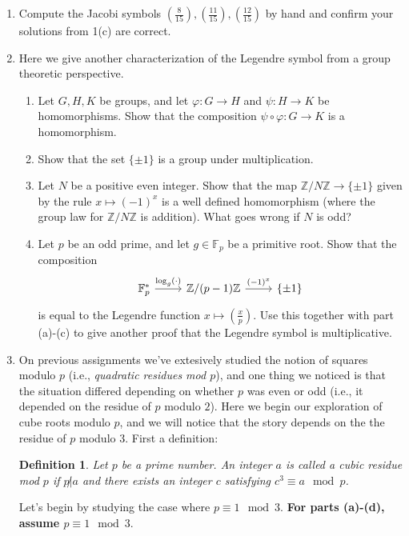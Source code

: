 \documentclass[11pt]{article}
\newtheorem{definition}{Definition}
\newcommand{\bF}{\mathbb{F}}
\newcommand{\bZ}{\mathbb{Z}}
\begin{document}
\begin{enumerate}
{\begin{enumerate}
  \end{enumerate}
  }
  \item{
  Compute the Jacobi symbols $\left(\frac{8}{15}\right),\left(\frac{11}{15}\right),\left(\frac{12}{15}\right)$ by hand and confirm your solutions from 1(c) are correct.
  }
  \item{
  Here we give another characterization of the Legendre symbol from a group theoretic perspective.
  \begin{enumerate}
    \item{
    Let $G,H,K$ be groups, and let $\varphi:G\to H$ and $\psi:H\to K$ be homomorphisms.  Show that the composition $\psi\circ\varphi:G\to K$ is a homomorphism.
    }
    \item{
    Show that the set $\{\pm1\}$ is a group under multiplication.
    }
    \item{
    Let $N$ be a positive even integer.  Show that the map $\bZ/N\bZ\to\{\pm1\}$ given by the rule $x\mapsto (-1)^x$ is a well defined homomorphism (where the group law for $\bZ/N\bZ$ is addition).  What goes wrong if $N$ is odd?
    }
    \item{
    Let $p$ be an odd prime, and let $g\in\bF_p$ be a primitive root.  Show that the composition
    \[
    \begin{tikzcd}
      \bF_p^*\ar[r,"\log_g(\cdot)"]&\bZ/(p-1)\bZ\ar[r,"(-1)^x"]&\{\pm1\}
    \end{tikzcd}
    \]
    is equal to the Legendre function $x\mapsto\left(\frac{x}{p}\right)$.  Use this together with part (a)-(c) to give another proof that the Legendre symbol is multiplicative.
    }
  \end{enumerate}
  }
  \item{
  On previous assignments we've extesively studied the notion of squares modulo $p$ (i.e., \textit{quadratic residues mod $p$}), and one thing we noticed is that the situation differed depending on whether $p$ was even or odd (i.e., it depended on the residue of $p$ modulo $2$).  Here we begin our exploration of cube roots modulo $p$, and we will notice that the story depends on the the residue of $p$ modulo 3.  First a definition:
  \begin{definition}
    Let $p$ be a prime number.  An integer $a$ is called a \textit{cubic residue mod $p$} if $p\not|a$ and there exists an integer $c$ satisfying $c^3\equiv a\mod p$.
  \end{definition}
  Let's begin by studying the case where $p\equiv 1\mod 3$.  \textbf{For parts (a)-(d), assume $p\equiv1\mod 3$}.
}
\end{enumerate}
\end{document}
